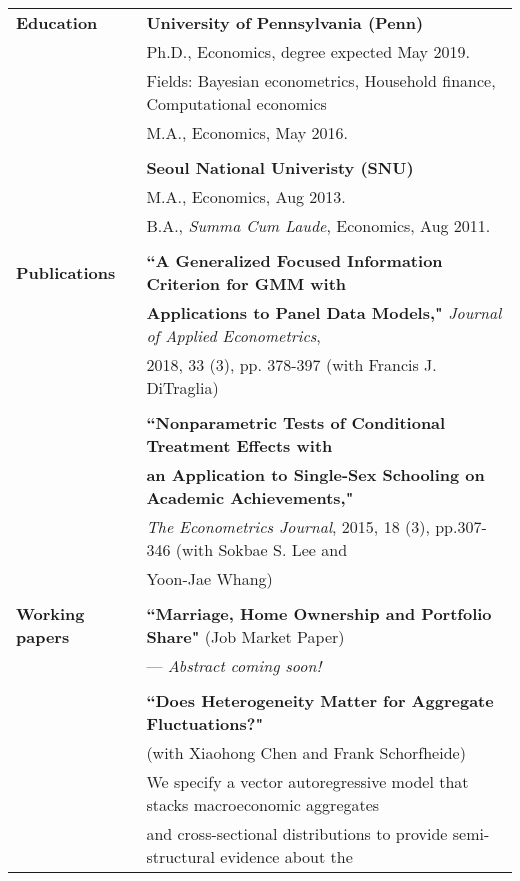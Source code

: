 \documentclass[letterpaper,11pt,oneside]{article}
\begin{document}
\noindent \begin{tabular}{@{} l l}
 \large{\textbf{Education}} 
    & \textbf{University of Pennsylvania (Penn)} \\
     & Ph.D., Economics, degree expected May 2019. \\
     & Fields: Bayesian econometrics, Household finance, Computational economics \\
     & M.A., Economics, May 2016. \\
     & \\
     & \textbf{Seoul National Univeristy (SNU)} \\
          & M.A., Economics, Aug 2013. \\
     & B.A., \textit{Summa Cum Laude}, Economics, Aug 2011. \\
     \vspace{0.1in} \\
      \large{\textbf{Publications}}    & \textbf{``A Generalized Focused Information Criterion for GMM with } \\
 &\textbf{Applications to Panel Data Models,"}  \textit{Journal of Applied Econometrics},\\
 & 2018, 33 (3), pp. 378-397 (with Francis J. DiTraglia) \\
    & \\
 & \textbf{``Nonparametric Tests of Conditional Treatment Effects with}\\
 & \textbf{an Application to Single-Sex Schooling on Academic Achievements,"} \\
 & \textit{The Econometrics Journal}, 2015, 18 (3), pp.307-346 (with Sokbae S. Lee and \\
 & Yoon-Jae Whang) \\ 
  \vspace{0.1in} \\
 \large{\textbf{Working papers}}    & \textbf{``Marriage, Home Ownership and Portfolio Share"} (Job Market Paper)\\
 & --- \textit{Abstract coming soon!}\\[0.1in]
    & \\
  & \textbf{``Does Heterogeneity Matter for Aggregate Fluctuations?"}\\
  & (with Xiaohong Chen and Frank Schorfheide)\\[0.05in] 
  & We specify a vector autoregressive model that stacks macroeconomic aggregates\\
 & and cross-sectional distributions to provide semi-structural evidence about the \\

\end{tabular}
\end{document}
